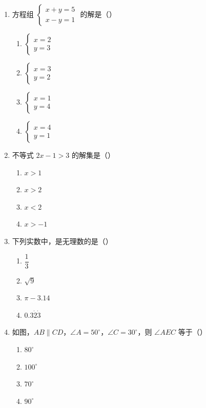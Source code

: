 \documentclass[12pt, a4paper]{ctexart}
\newcommand{\blank}[1]{\underline{\hspace{#1}}}
\begin{document}
\begin{enumerate}[label=\textbf{\arabic*.}, leftmargin=2.5em]
\item 方程组 $\begin{cases} x + y = 5 \\ x - y = 1 \end{cases}$ 的解是（\blank{1cm}）
\begin{enumerate}[label=\Alph*., nosep]
\item $\begin{cases} x = 2 \\ y = 3 \end{cases}$
\item $\begin{cases} x = 3 \\ y = 2 \end{cases}$
\item $\begin{cases} x = 1 \\ y = 4 \end{cases}$
\item $\begin{cases} x = 4 \\ y = 1 \end{cases}$
\end{enumerate}

\vspace{6pt}

\item 不等式 $2x - 1 > 3$ 的解集是（\blank{1cm}）
\begin{enumerate}[label=\Alph*., nosep]
\item $x > 1$
\item $x > 2$
\item $x < 2$
\item $x > -1$
\end{enumerate}

\vspace{6pt}

\item 下列实数中，是无理数的是（\blank{1cm}）
\begin{enumerate}[label=\Alph*., nosep]
\item $\dfrac{1}{3}$
\item $\sqrt{9}$
\item $\pi - 3.14$
\item $0.3\dot{2}\dot{3}$
\end{enumerate}

\vspace{6pt}

\item 如图，$AB \parallel CD$，$\angle A = 50^{\circ}$，$\angle C = 30^{\circ}$，则 $\angle AEC$ 等于（\blank{1cm}）
\begin{enumerate}[label=\Alph*., nosep]
\item $80^{\circ}$
\item $100^{\circ}$
\item $70^{\circ}$
\item $90^{\circ}$
\end{enumerate}


\end{enumerate}
\end{document}
